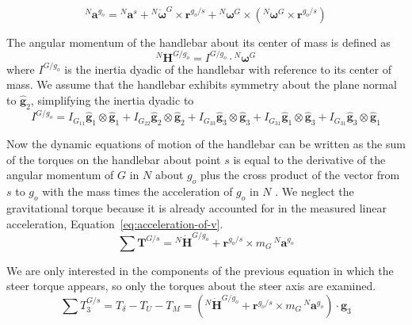 \documentclass[10pt]{article}
\begin{document}
\begin{equation}
  ^N\mathbf{a}^{g_o} = {}^N\mathbf{a}^s +
    {}^N\dot{\boldsymbol{\omega}}^G\times\mathbf{r}^{g_o/s} +
    {}^N\boldsymbol{\omega}^G\times({}^N\boldsymbol{\omega}^G\times\mathbf{r}^{g_o/s})
\end{equation}

The angular momentum of the handlebar about its center of mass is defined as
%
\begin{equation}
  ^N\mathbf{H}^{G/g_o} = I^{G/g_o} \cdot {}^N\boldsymbol{\omega}^G
\end{equation}
%
where $I^{G/g_o}$ is the inertia dyadic of the handlebar with reference to its
center of mass. We assume that the handlebar exhibits symmetry about the plane
normal to $\hat{\mathbf{g}}_2$, simplifying the inertia dyadic to
%
\begin{equation}
  I^{G/g_o} =
    I_{G_{11}} \hat{\mathbf{g}}_1 \otimes \hat{\mathbf{g}}_1 +
    I_{G_{22}} \hat{\mathbf{g}}_2 \otimes \hat{\mathbf{g}}_2 +
    I_{G_{33}} \hat{\mathbf{g}}_3 \otimes \hat{\mathbf{g}}_3 +
    I_{G_{31}} \hat{\mathbf{g}}_1 \otimes \hat{\mathbf{g}}_3 +
    I_{G_{31}} \hat{\mathbf{g}}_3 \otimes \hat{\mathbf{g}}_1
\end{equation}

Now the dynamic equations of motion of the handlebar can be written as the sum
of the torques on the handlebar about point $s$ is equal to the derivative of
the angular momentum of $G$ in $N$ about $g_o$ plus the cross product of the
vector from $s$ to $g_o$ with the mass times the acceleration of $g_o$ in $N$
\cite{Meriam1975}. We neglect the gravitational torque because it is already
accounted for in the measured linear acceleration,
Equation~\ref{eq:acceleration-of-v}.
%
\begin{equation}
  \sum \mathbf{T}^{G/s} = {}^N\dot{\mathbf{H}}^{G/g_o} +
    \mathbf{r}^{g_o/s} \times m_G\,{}^N\mathbf{a}^{g_o}
\end{equation}

We are only interested in the components of the previous equation in which the
steer torque appears, so only the torques about the steer axis are examined.
%
\begin{equation}
  \sum T^{G/s}_3 = T_\delta - T_U - T_M = \left({}^N\dot{\mathbf{H}}^{G/g_o} +
  \mathbf{r}^{g_o/s} \times m_G\,{}^N\mathbf{a}^{g_o}\right) \cdot \hat{\mathbf{g}}_3
\end{equation}
\end{document}
